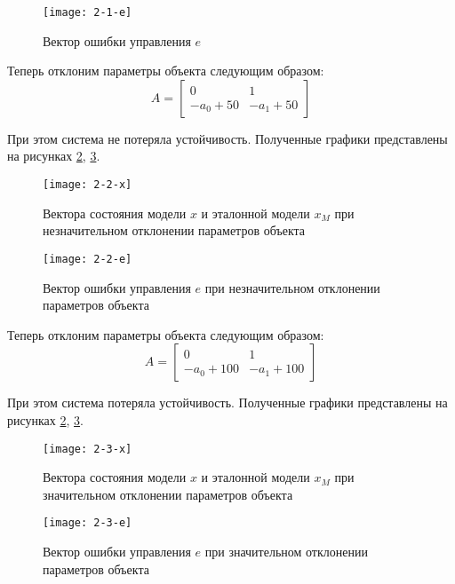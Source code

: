 \documentclass[14pt, a4paper]{extarticle}
\begin{document}
\begin{enumerate}
		\begin{figure}[H]
			\centering
			\texttt{[image: 2-1-e]}
			\caption{Вектор ошибки управления $e$}
			\label{fig:2-1-e}
		\end{figure}
		
		Теперь отклоним параметры объекта следующим образом:
		$$A=\left[
		\begin{matrix}
			0 & 1 \\
			-a_0+50 & -a_1+50 
		\end{matrix}
		\right]$$
		
		При этом система не потеряла устойчивость. Полученные графики представлены на рисунках \ref{fig:2-2-x}, \ref{fig:2-2-e}.
		
		\begin{figure}[H]
			\centering
			\texttt{[image: 2-2-x]}
			\caption{Вектора состояния модели $x$ и эталонной модели $x_M$ при незначительном отклонении параметров объекта}
			\label{fig:2-2-x}
		\end{figure}
		
		\begin{figure}[H]
			\centering
			\texttt{[image: 2-2-e]}
			\caption{Вектор ошибки управления $e$ при незначительном отклонении параметров объекта}
			\label{fig:2-2-e}
		\end{figure}
		
		Теперь отклоним параметры объекта следующим образом:
		$$A=\left[
		\begin{matrix}
			0 & 1 \\
			-a_0+100 & -a_1+100 
		\end{matrix}
		\right]$$
		
		При этом система потеряла устойчивость. Полученные графики представлены на рисунках \ref{fig:2-2-x}, \ref{fig:2-2-e}.
		
		\begin{figure}[H]
			\centering
			\texttt{[image: 2-3-x]}
			\caption{Вектора состояния модели $x$ и эталонной модели $x_M$ при значительном отклонении параметров объекта}
			\label{fig:2-3-x}
		\end{figure}
		
		\begin{figure}[H]
			\centering
			\texttt{[image: 2-3-e]}
			\caption{Вектор ошибки управления $e$ при значительном отклонении параметров объекта}
			\label{fig:2-3-e}
		\end{figure}
		

\end{enumerate}
\end{document}
